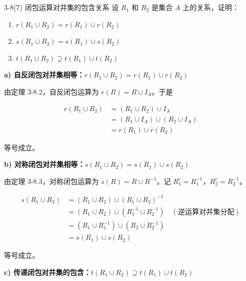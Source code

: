 \documentclass[11pt]{article}
\begin{document}
\begin{question}{3-8(7) 闭包运算对并集的包含关系}
  设 $R_1$ 和 $R_2$ 是集合 $A$ 上的关系，证明：

  \begin{enumerate}
    \item[a)] $r(R_1 \cup R_2) = r(R_1) \cup r(R_2)$
    \item[b)] $s(R_1 \cup R_2) = s(R_1) \cup s(R_2)$
    \item[c)] $t(R_1 \cup R_2) \supseteq t(R_1) \cup t(R_2)$
  \end{enumerate}

  \begin{answer}
    \vspace{1em}

    \noindent\textbf{a) 自反闭包对并集相等：$r(R_1 \cup R_2) = r(R_1) \cup r(R_2)$}

    \vspace{1em}

    由定理 3-8.2，自反闭包运算为 $r(R) = R \cup I_A$。于是

    \begin{align}
      r(R_1 \cup R_2) &= (R_1 \cup R_2) \cup I_A \\
      &= (R_1 \cup I_A) \cup (R_2 \cup I_A) \\
      &= r(R_1) \cup r(R_2)
    \end{align}

    等号成立。

    \vspace{1em}
    \noindent\textbf{b) 对称闭包对并集相等：$s(R_1 \cup R_2) = s(R_1) \cup s(R_2)$}

    \vspace{1em}

    由定理 3-8.3，对称闭包运算为 $s(R) = R \cup R^{-1}$。记 $R_1^c = R_1^{-1}$，$R_2^c = R_2^{-1}$。

    \begin{align}
      s(R_1 \cup R_2) &= (R_1 \cup R_2) \cup (R_1 \cup R_2)^{-1} \\
      &= (R_1 \cup R_2) \cup (R_1^{-1} \cup R_2^{-1}) \quad (\text{逆运算对并集分配}) \\
      &= (R_1 \cup R_1^{-1}) \cup (R_2 \cup R_2^{-1}) \\
      &= s(R_1) \cup s(R_2)
    \end{align}

    等号成立。

    \vspace{1em}
    \noindent\textbf{c) 传递闭包对并集的包含：$t(R_1 \cup R_2) \supseteq t(R_1) \cup t(R_2)$}


\end{answer}
\end{question}
\end{document}
